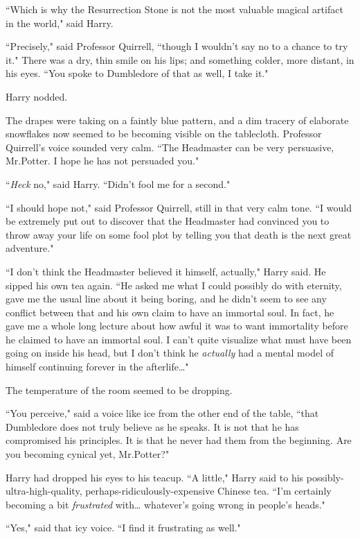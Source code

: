 ``Which is why the Resurrection Stone is not the most valuable magical artifact in the world," said Harry.

``Precisely," said Professor Quirrell, ``though I wouldn't say no to a chance to try it." There was a dry, thin smile on his lips; and something colder, more distant, in his eyes. ``You spoke to Dumbledore of that as well, I take it."

Harry nodded.

The drapes were taking on a faintly blue pattern, and a dim tracery of elaborate snowflakes now seemed to be becoming visible on the tablecloth. Professor Quirrell's voice sounded very calm. ``The Headmaster can be very persuasive, Mr.\?Potter. I hope he has not persuaded you."

``\emph{Heck} no," said Harry. ``Didn't fool me for a second."

``I should hope not," said Professor Quirrell, still in that very calm tone. ``I would be extremely put out to discover that the Headmaster had convinced you to throw away your life on some fool plot by telling you that death is the next great adventure."

``I don't think the Headmaster believed it himself, actually," Harry said. He sipped his own tea again. ``He asked me what I could possibly do with eternity, gave me the usual line about it being boring, and he didn't seem to see any conflict between that and his own claim to have an immortal soul. In fact, he gave me a whole long lecture about how awful it was to want immortality before he claimed to have an immortal soul. I can't quite visualize what must have been going on inside his head, but I don't think he \emph{actually} had a mental model of himself continuing forever in the afterlife{\ldots}"

The temperature of the room seemed to be dropping.

``You perceive," said a voice like ice from the other end of the table, ``that Dumbledore does not truly believe as he speaks. It is not that he has compromised his principles. It is that he never had them from the beginning. Are you becoming cynical yet, Mr.\?Potter?"

Harry had dropped his eyes to his teacup. ``A little," Harry said to his possibly-ultra-high-quality, perhaps-ridiculously-expensive Chinese tea. ``I'm certainly becoming a bit \emph{frustrated} with{\ldots} whatever's going wrong in people's heads."

``Yes," said that icy voice. ``I find it frustrating as well."

